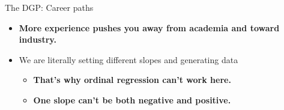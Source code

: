 \documentclass[
  ignorenonframetext,
]{beamer}
\begin{document}
\begin{frame}[fragile]{The DGP: Career paths}
{\begin{itemize}
  \begin{itemize}
  \item
    \textbf{More experience pushes you away from academia and toward
    industry.}
  \item
    We are literally setting different slopes and generating data

    \begin{itemize}
    \item
      \textbf{That's why ordinal regression can't work here.}
    \item
      \textbf{One slope can't be both negative and positive.}
    \end{itemize}
  \end{itemize}
\end{itemize}}
\end{frame}
\end{document}
